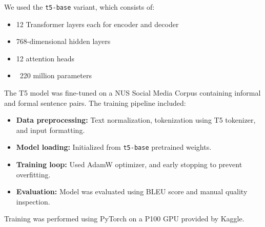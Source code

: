 We used the \texttt{t5-base} variant, which consists of:
\begin{itemize}
  \item 12 Transformer layers each for encoder and decoder
  \item 768-dimensional hidden layers
  \item 12 attention heads
  \item ~220 million parameters
\end{itemize}

The T5 model was fine-tuned on a NUS Social Media Corpus\cite{NUS_Dataset} containing informal and formal sentence pairs. The training pipeline included:

\begin{itemize}
  \item \textbf{Data preprocessing:} Text normalization, tokenization using T5 tokenizer, and input formatting.
  \item \textbf{Model loading:} Initialized from \texttt{t5-base} pretrained weights.
  \item \textbf{Training loop:} Used AdamW optimizer, and early stopping to prevent overfitting.
  \item \textbf{Evaluation:} Model was evaluated using BLEU score and manual quality inspection.
\end{itemize}
Training was performed using PyTorch on a P100 GPU provided by Kaggle.